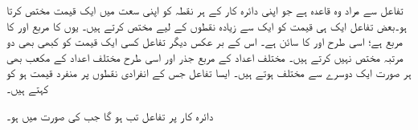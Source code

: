 تفاعل سے مراد وہ قاعدہ ہے جو اپنی دائرہ کار کے ہر نقطہ کو اپنی سعت میں ایک قیمت مختص کرتا ہو۔بعض تفاعل ایک ہی قیمت کو ایک سے زیادہ  نقطوں  کے لیے مختص کرتے ہیں۔ یوں  کا مربع اور  کا مربع  ہے؛ اسی طرح  اور  کا سائن  ہے۔ اس کے بر عکس دیگر تفاعل کسی ایک قیمت کو کبھی بھی دو مرتبہ مختص نہیں کرتے ہیں۔ مختلف اعداد کے  مربع جذر اور اسی طرح مختلف اعداد کے مکعب بھی      ہر صورت ایک دوسرے سے مختلف ہوتے ہیں۔ ایسا تفاعل جس کے انفرادی نقطوں پر منفرد قیمت ہو کو  کہتے ہیں۔

دائرہ کار  پر تفاعل   تب  ہو گا جب  کی صورت میں  ہو۔


